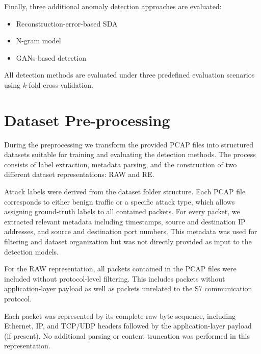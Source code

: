 Finally, three additional anomaly detection approaches are evaluated:

\begin{itemize}
    \item Reconstruction-error-based \ac{SDA}
    \item N-gram model
    \item \ac{GANs}-based detection
\end{itemize}

All detection methods are evaluated under three predefined
evaluation scenarios using $k$-fold cross-validation.




\section{Dataset Pre-processing}

During the preprocessing we transform the provided PCAP files into
structured datasets suitable for training and evaluating the detection
methods. The process consists of label extraction, metadata parsing,
and the construction of two different dataset representations: RAW
and \ac{RE}.

Attack labels were derived from the dataset folder structure.
Each PCAP file corresponds to either benign traffic or a specific
attack type, which allows assigning ground-truth labels to all
contained packets.
For every packet, we extracted relevant metadata including timestamps,
source and destination \ac{IP} addresses, and source and destination
port numbers. This metadata was used for filtering and dataset
organization but was not directly provided as input to the detection
models.


For the RAW representation, all packets contained in the PCAP files
were included without protocol-level filtering. This includes packets
without application-layer payload as well as packets unrelated to
the S7 communication protocol.

Each packet was represented by its complete raw byte sequence,
including Ethernet, \ac{IP}, and \ac{TCP}/\ac{UDP} headers followed by the
application-layer payload (if present). No additional parsing or
content truncation was performed in this representation.

